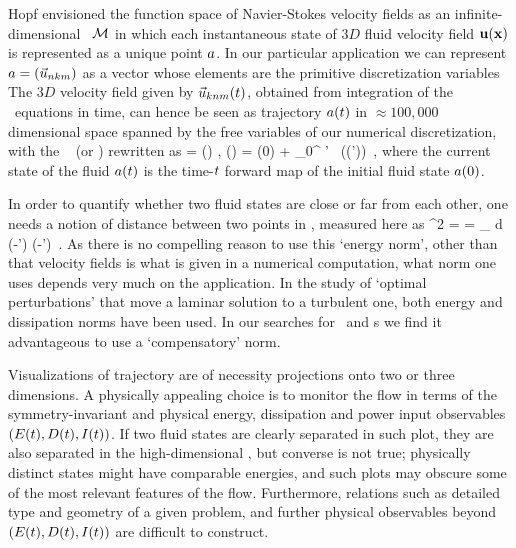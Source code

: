 Hopf envisioned the function space of {Navier-Stokes} velocity fields as
an infinite-dimensional \statesp\ ${\cal M}$ in which each instantaneous state
of $3D$ fluid velocity field ${\bf u}({\bf x})$ is represented as a unique point
$a$. In our particular application we can represent $a =
(\vec{u}_{nkm})$ as a vector whose elements are the primitive
discretization variables  %
The $3D$ velocity field given
by $\vec{u}_{knm}(t)$, obtained from integration of the \NS\
equations in time, can hence be seen as trajectory $a(t)$ in
$\approx 100,000$ dimensional space spanned by the free variables of our
numerical discretization, with the \NSe\ %
(or \KSe)
rewritten as
\beq
   \dot{\ssp} = \vel(\ssp) ,
   \qquad
   \ssp(\zeit) = \ssp(0)
            + \int_0^\zeit \! \zeit' \, \vel(\ssp(\zeit'))
\,,
where the current state of the fluid $ a(t)$ is the time-$t$
forward map of the initial fluid state  $a(0)$.

In order to quantify whether two fluid states are close or far from each
other, one needs a notion of distance between two points in \statesp,
measured here as
\beq
  ^2  =  =
\int_\bCell \! d \bx \;
(-\vec{u}') \cdot (-')
\,.
As there is no compelling reason to use this {`energy norm'}, other than
that velocity fields is what is given in a numerical computation, what
norm one uses depends very much on the application. In the study of
`optimal perturbations' that move a laminar solution to a turbulent one,
both energy\rf{TeHaHe10} and dissipation\rf{LoCaCoPeGo11} norms
have been used.  In our searches for \reqva\ and \rpo s
we find it advantageous to use a `compensatory' norm.

Visualizations of trajectory  are of necessity
projections onto two or three dimensions. A physically appealing
choice\rf{KawKida01} is to monitor the flow in terms of the
symmetry-invariant and physical energy, dissipation and power input
observables $(E(t),D(t),I(t))$.
If two fluid states are clearly separated in
such plot, they are also separated in the high-dimensional \statesp, but
converse is not true; physically distinct states might have comparable
energies, and such plots may obscure some of the most relevant features
of the flow. Furthermore, relations such as \refeq{EnRate}
detailed type and geometry of a given problem,
and further physical observables beyond $(E(t),D(t),I(t))$
are difficult to construct.

